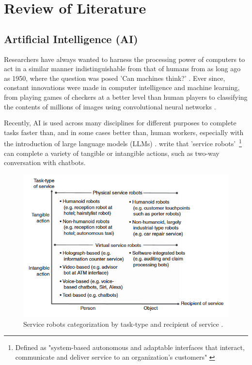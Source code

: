 \documentclass[12pt]{report}
\begin{document}
    \pagebreak %

    \section{Review of Literature}

    \subsection{Artificial Intelligence (AI)}


    Researchers have always wanted to harness the processing power of computers to act in a similar manner 
    indistinguishable from that of humans from as long ago as 1950, where the question was posed 
    'Can machines think?' \autocite{turing_icomputing_1950}. Ever since, constant innovations were made in computer 
    intelligence and machine learning, from playing games of checkers at a better level than human players \autocite{samuel_studies_1959}
    to classifying the contents of millions of images using convolutional neural networks \autocite{krizhevsky_imagenet_2012}.

    Recently, AI is used across many disciplines for different purposes to complete tasks faster than, and in some cases better than,
    human workers, especially with the introduction of large language models (LLMs) \autocite{AIDigitalAssistants}. \textcite{wirtz_brave_2018} write that 'service robots'~\footnote{Defined as "system-based autonomous and adaptable interfaces that 
    interact, communicate and deliver service to an organization’s customers" \autocite[p.909]{wirtz_brave_2018}} can complete a variety of 
    tangible or intangible actions, such as two-way conversation with chatbots.
    
    \begin{figure}[H]
        \centering
        \includegraphics[width=.8\linewidth]{serviceBots.png}
        \caption{Service robots categorization by task-type and recipient of service \autocite{wirtz_brave_2018}.}
        \label{fig:serviceBots}
    \end{figure}
\end{document}
